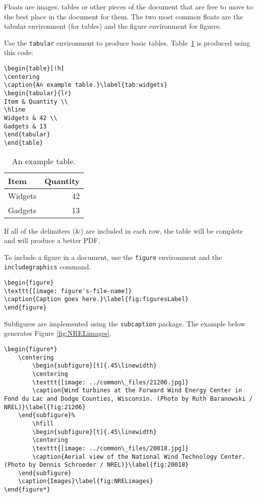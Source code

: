 Floats are images, tables or other pieces of the document that are free to move to the best place in the document for them. The two most common floats are the tabular environment (for tables) and the figure environment for figures.

Use the \texttt{tabular} environment to produce basic tables. Table~\ref{tab:widgets} is produced using this code: 

\begin{lstlisting}
\begin{table}[!h]
\centering
\caption{An example table.}\label{tab:widgets}
\begin{tabular}{lr}
Item & Quantity \\
\hline
Widgets & 42 \\
Gadgets & 13
\end{tabular}
\end{table}
\end{lstlisting}

\begin{table}[!h]
\centering
\caption{An example table.}\label{tab:widgets}
\begin{tabular}{lr}
Item & Quantity \\
\hline
Widgets & 42 \\
Gadgets & 13
\end{tabular}
\end{table}

If all of the delimiters (\&) are included in each row, the table will be complete and will produce a better PDF.

To include a figure in a document, use the \texttt{figure} environment and the \texttt{includegraphics} command.

\begin{lstlisting}
\begin{figure}
\texttt{[image: figure's-file-name]}
\caption{Caption goes here.}\label{fig:figuresLabel}
\end{figure}
\end{lstlisting}

Subfigures are implemented using the \texttt{subcaption} package. The example below generates Figure \ref{fig:NRELimages}.

\begin{lstlisting}
\begin{figure*}
	\centering
        \begin{subfigure}[t]{.45\linewidth}
		\centering
		\texttt{[image: ../common\_files/21206.jpg]}
		\caption{Wind turbines at the Forward Wind Energy Center in Fond du Lac and Dodge Counties, Wisconsin. (Photo by Ruth Baranowski / NREL)}\label{fig:21206}
	\end{subfigure}%
        \hfill
        \begin{subfigure}[t]{.45\linewidth}
		\centering
		\texttt{[image: ../common\_files/20018.jpg]}
		\caption{Aerial view of the National Wind Technology Center. (Photo by Dennis Schroeder / NREL)}\label{fig:20018}
	\end{subfigure}
	\caption{Images}\label{fig:NRELimages}
\end{figure*}
\end{lstlisting}

